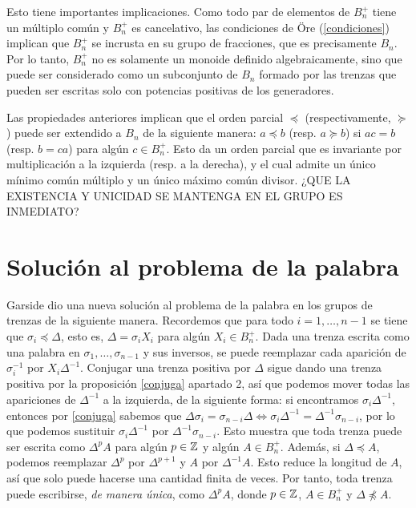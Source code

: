 \documentclass[TFG.tex]{subfiles}
\begin{document}
Esto tiene importantes implicaciones. Como todo par de elementos de $B_n^+$ tiene un múltiplo común y $B_n^+$ es cancelativo, las condiciones de Öre (\ref{condiciones}) implican que $B_n^+$ se incrusta en su grupo de fracciones, que es precisamente $B_n$. Por lo tanto, $B_n^+$ no es solamente un monoide definido algebraicamente, sino que puede ser considerado como un subconjunto de $B_n$ formado por las trenzas que pueden ser escritas solo con potencias positivas de los generadores. 

Las propiedades anteriores implican que el orden parcial $\preccurlyeq$ (respectivamente, $\succcurlyeq$) puede ser extendido a $B_n$ de la siguiente manera: $a\preccurlyeq b$ (resp. $a\succcurlyeq b$) si $ac=b$ (resp. $b=ca$) para algún $c\in B_n^+$. Esto da un orden parcial que es invariante por multiplicación a la izquierda (resp. a la derecha), y el cual admite un único mínimo común múltiplo y un único máximo común divisor. ¿QUE LA EXISTENCIA Y UNICIDAD SE MANTENGA EN EL GRUPO ES INMEDIATO?

\section{Solución al problema de la palabra}
Garside dio una nueva solución al problema de la palabra en los grupos de trenzas de la siguiente manera. Recordemos que para todo $i=1,\dots, n-1$ se tiene que $\sigma_i\preccurlyeq\Delta$, esto es, $\Delta=\sigma_iX_i$ para algún $X_i\in B_n^+$. Dada una trenza escrita como una palabra en $\sigma_1,\dots,\sigma_{n-1}$ y sus inversos, se puede reemplazar cada aparición de $\sigma_i^{-1}$ por $X_i\Delta^{-1}$. Conjugar una trenza positiva por $\Delta$ sigue dando una trenza positiva por la proposición \ref{conjuga} apartado 2, así que podemos mover todas las apariciones de $\Delta^{-1}$ a la izquierda, de la siguiente forma: si encontramos $\sigma_i\Delta^{-1}$, entonces por \ref{conjuga} sabemos que $\Delta\sigma_{i}=\sigma_{n-i}\Delta\Leftrightarrow  \sigma_i\Delta^{-1}=\Delta^{-1}\sigma_{n-i}$, por lo que podemos sustituir $\sigma_i\Delta^{-1}$ por $\Delta^{-1}\sigma_{n-i}$. Esto muestra que toda trenza puede ser escrita como $\Delta^p A$ para algún $p\in\mathbb{Z}$ y algún $A\in B_n^+$. Además, si $\Delta\preccurlyeq A$, podemos reemplazar $\Delta^p$ por $\Delta^{p+1}$ y $A$ por $\Delta^{-1}A$. Esto reduce la longitud de $A$, así que solo puede hacerse una cantidad finita de veces. Por tanto, toda trenza puede escribirse, \emph{de manera única}, como $\Delta^pA$, donde $p\in\mathbb{Z}$, $A\in B_n^+$ y $\Delta\not\preccurlyeq A$. 
\end{document}
